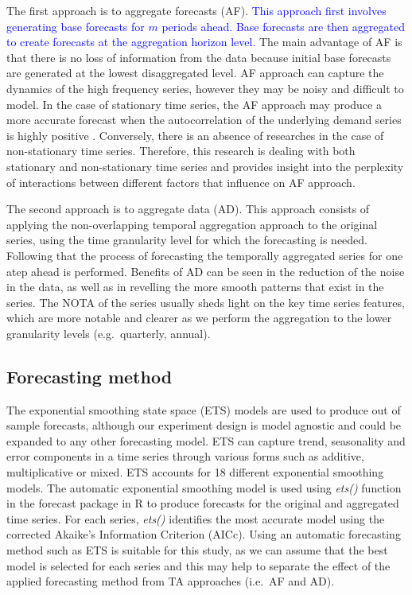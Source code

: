 \documentclass[preprint, 3p,
authoryear]{elsarticle} %
\begin{document}
The first approach is to aggregate forecasts (AF).
\textcolor{blue}{This approach first involves generating base forecasts for $m$ periods ahead. Base forecasts are then aggregated to create forecasts at the aggregation horizon level.}
The main advantage of AF is that there is no loss of information from
the data because initial base forecasts are generated at the lowest
disaggregated level. AF approach can capture the dynamics of the high
frequency series, however they may be noisy and difficult to model. In
the case of stationary time series, the AF approach may produce a more
accurate forecast when the autocorrelation of the underlying demand
series is highly positive \citep{rostami2014note}. Conversely, there is
an absence of researches in the case of non-stationary time series.
Therefore, this research is dealing with both stationary and
non-stationary time series and provides insight into the perplexity of
interactions between different factors that influence on AF approach.

The second approach is to aggregate data (AD). This approach consists of
applying the non-overlapping temporal aggregation approach to the
original series, using the time granularity level for which the
forecasting is needed. Following that the process of forecasting the
temporally aggregated series for one atep ahead is performed. Benefits
of AD can be seen in the reduction of the noise in the data, as well as
in revelling the more smooth patterns that exist in the series. The NOTA
of the series usually sheds light on the key time series features, which
are more notable and clearer as we perform the aggregation to the lower
granularity levels (e.g.~quarterly, annual).

\hypertarget{forecasting-method}{%
\subsection{Forecasting method}\label{forecasting-method}}

The exponential smoothing state space (ETS) models
\citep{hyndman2021forecasting} are used to produce out of sample
forecasts, although our experiment design is model agnostic and could be
expanded to any other forecasting model. ETS can capture trend,
seasonality and error components in a time series through various forms
such as additive, multiplicative or mixed. ETS accounts for 18 different
exponential smoothing models. The automatic exponential smoothing model
is used using \emph{ets()} function in the forecast package
\citep{hyndman2008automatic} in R to produce forecasts for the original
and aggregated time series. For each series, \emph{ets()} identifies the
most accurate model using the corrected Akaike's Information Criterion
(AICc). Using an automatic forecasting method such as ETS is suitable
for this study, as we can assume that the best model is selected for
each series and this may help to separate the effect of the applied
forecasting method from TA approaches (i.e.~AF and AD).
\end{document}
